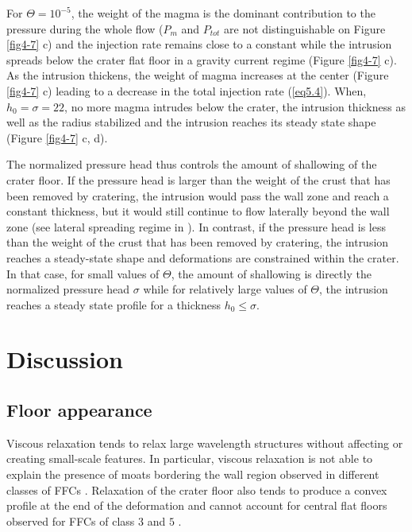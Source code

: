 \begin{article}
        For $\Theta=10^{-5}$, the weight of  the magma is the dominant
        contribution to the pressure during  the whole flow ($P_m$ and
        $P_{tot}$ are  not distinguishable  on Figure  \ref{fig4-7} c)
        and the injection  rate remains close to a  constant while the
        intrusion spreads  below the  crater flat  floor in  a gravity
        current  regime  (Figure  \ref{fig4-7} c).  As  the  intrusion
        thickens, the weight of magma  increases at the center (Figure
        \ref{fig4-7} c) leading  to a decrease in  the total injection
        rate  (\ref{eq5.4}). When,  $h_{0}=\sigma=22$,  no more  magma
        intrudes below the crater, the  intrusion thickness as well as
        the  radius stabilized  and the  intrusion reaches  its steady
        state shape (Figure \ref{fig4-7} c, d).

        The  normalized  pressure head  thus  controls  the amount  of
        shallowing of the crater floor. If the pressure head is larger
        than  the  weight  of  the  crust that  has  been  removed  by
        cratering, the intrusion would pass  the wall zone and reach a
        constant  thickness,  but  it  would still  continue  to  flow
        laterally beyond  the wall zone (see  lateral spreading regime
        in \citet{Michaut2011}). In contrast,  if the pressure head is
        less than  the weight of  the crust  that has been  removed by
        cratering,  the intrusion  reaches  a  steady-state shape  and
        deformations are constrained within  the crater. In that case,
        for  small values  of $\Theta$,  the amount  of shallowing  is
        directly  the  normalized  pressure head  $\sigma$  while  for
        relatively large  values of $\Theta$, the  intrusion reaches a
        steady state profile for a thickness $h_{0}\le \sigma$.
	
	
        \section{Discussion}

	\subsection{Floor appearance}
	
	Viscous relaxation tends to  relax large wavelength structures
        without  affecting   or  creating  small-scale   features.  In
        particular,  viscous relaxation  is  not able  to explain  the
        presence  of  moats  bordering  the wall  region  observed  in
        different             classes              of             FFCs
        \citep{Schultz1976,Jozwiak2012}.  Relaxation   of  the  crater
        floor also tends to produce a convex profile at the end of the
        deformation \citep{Dombard2001} and cannot account for central
        flat  floors   observed  for  FFCs   of  class  $3$   and  $5$
        \citep{Jozwiak2012}.
	

\end{article}
